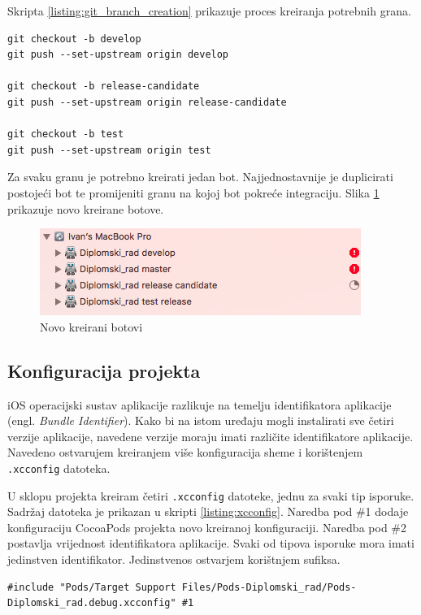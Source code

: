 \documentclass[times, utf8, diplomski, numeric]{fer}
\newcommand{\eng}[1]{(engl. \textit{#1})}
\begin{document}
\begin{appendices}
Skripta \ref{listing:git_branch_creation} prikazuje proces kreiranja potrebnih grana.

\begin{lstlisting}[caption=Kreiranje potrebnih grana Gitflow radnog toka, label=listing:git_branch_creation]
git checkout -b develop
git push --set-upstream origin develop

git checkout -b release-candidate
git push --set-upstream origin release-candidate

git checkout -b test
git push --set-upstream origin test
\end{lstlisting}

Za svaku granu je potrebno kreirati jedan bot. Najjednostavnije je duplicirati postojeći bot te promijeniti granu na kojoj bot pokreće integraciju. Slika \ref{fig:MultipleBots} prikazuje novo kreirane botove.

\begin{figure}
\centering
\includegraphics[scale=0.7]{MultipleBots}
\caption{Novo kreirani botovi}
\label{fig:MultipleBots}
\end{figure}

\subsection{Konfiguracija projekta}

iOS operacijski sustav aplikacije razlikuje na temelju identifikatora aplikacije \eng{Bundle Identifier}. Kako bi na istom uređaju mogli instalirati sve četiri verzije aplikacije, navedene verzije moraju imati različite identifikatore aplikacije. Navedeno ostvarujem kreiranjem više konfiguracija sheme i korištenjem \verb|.xcconfig| datoteka.

U sklopu projekta kreiram četiri \verb|.xcconfig| datoteke, jednu za svaki tip isporuke. Sadržaj datoteka je prikazan u skripti \ref{listing:xcconfig}. Naredba pod \#1 dodaje konfiguraciju CocoaPods projekta novo kreiranoj konfiguraciji. Naredba pod \#2 postavlja vrijednost identifikatora aplikacije. Svaki od tipova isporuke mora imati jedinstven identifikator. Jedinstvenos ostvarjem korištnjem sufiksa.

\begin{lstlisting}[caption=Sadržaj .xcconfig datoteke, label=listing:xcconfig]
#include "Pods/Target Support Files/Pods-Diplomski_rad/Pods-Diplomski_rad.debug.xcconfig" #1


\end{lstlisting}
\end{appendices}
\end{document}
